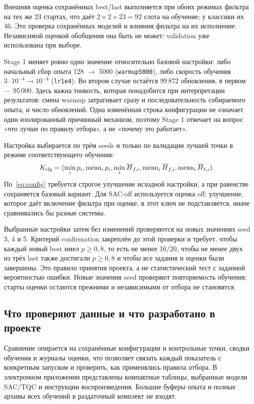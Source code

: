 Внешняя оценка сохранённых best/last выполняется при обоих режимах фильтра на тех же 23 стартах, что даёт $2\times2\times23=92$ слота на обучение; у классики их 46. Это проверка сохранённых моделей и влияния фильтра на их исполнение. Независимой оценкой обобщения она быть не может: validation уже использована при выборе.

Stage 1 меняет ровно одно значение относительно базовой настройки: либо начальный сбор опыта 128 $\to$ 5000 (\texttt{warmup5000}), либо скорость обучения $3\cdot10^{-4}\to10^{-4}$ (\texttt{lr1e4}). Во втором случае остаётся 99\,872 обновления, в первом — 95\,000. Здесь важна тонкость, которая понадобится при интерпретации результатов: смена warmup затрагивает сразу и последовательность собираемого опыта, и число обновлений. Одна изменённая строка конфигурации не означает один изолированный причинный механизм, поэтому Stage 1 отвечает на вопрос «что лучше по правилу отбора», а не «почему это работает».

Настройка выбирается по трём seeds и только по валидации лучшей точки в режиме соответствующего обучения:
\begin{equation}
K_{\rm cfg}=(\min_i p_i,\operatorname{mean}_i p_i,
\min_i\overline H_{f,i},\operatorname{mean}_i\overline H_{f,i},
\operatorname{mean}_i\overline H_{\ell,i}).
\label{eq:config}
\end{equation}
По~\eqref{eq:config} требуется строгое улучшение исходной настройки, а при равенстве сохраняется базовый вариант. Для SAC-off используется оценка off: улучшение, которое даёт включение фильтра при оценке, в этот ключ не подставляется, иначе сравнивались бы разные системы.

Выбранные настройки затем без изменений проверяются на новых значениях seed 3, 4 и 5. Критерий confirmation закреплён до этой проверки и требует, чтобы каждый новый best имел $p\geq0{,}8$, то есть не менее 16/20, чтобы не менее двух из трёх last также достигали $p\geq0{,}8$ и чтобы все задания и оценки были завершены. Это правило принятия проекта, а не статистический тест с заданной вероятностью ошибки. Новые значения seed проверяют повторяемость обучения; старты оценки остаются прежними и независимыми от отбора не становятся.

\subsection{Что проверяют данные и что разработано в проекте}
Сравнение опирается на сохранённые конфигурации и контрольные точки, сводки обучения и журналы оценки, что позволяет связать каждый показатель с конкретным запуском и проверить, как применялись правила отбора. В электронном приложении представлены компактные таблицы, выбранные модели SAC/TQC и инструкции воспроизведения. Большие буферы опыта и полные архивы всех обучений в раздаточный комплект не входят.

